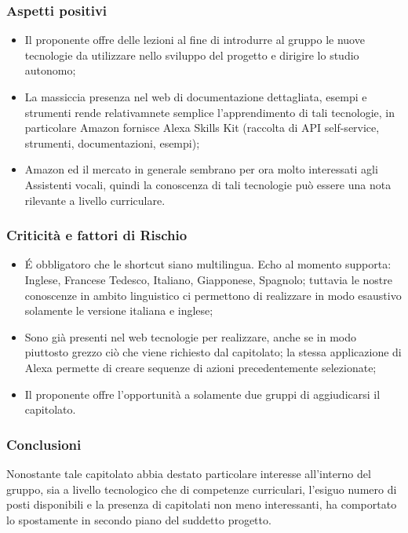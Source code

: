 \subsubsection{Aspetti positivi}
\begin{itemize}
    \item Il proponente offre delle lezioni al fine di introdurre al gruppo le nuove tecnologie da utilizzare nello sviluppo del progetto e dirigire lo studio autonomo;
    \item La massiccia presenza nel web di documentazione dettagliata, esempi e strumenti rende relativamnete semplice l'apprendimento di tali tecnologie, in particolare Amazon fornisce Alexa Skills Kit (raccolta di API self-service, strumenti, documentazioni, esempi);
    \item Amazon ed il mercato in generale sembrano per ora molto interessati agli Assistenti vocali, quindi la conoscenza di tali tecnologie può essere una nota rilevante a livello curriculare.
\end{itemize}
\subsubsection{Criticità e fattori di Rischio}
\begin{itemize}
    \item É obbligatoro che le shortcut siano multilingua. Echo al momento supporta: Inglese, Francese Tedesco, Italiano, Giapponese, Spagnolo; tuttavia le nostre conoscenze in ambito linguistico ci permettono di realizzare in modo esaustivo solamente le versione italiana e inglese;
    \item Sono già presenti nel web tecnologie per realizzare, anche se in modo piuttosto grezzo ciò che viene richiesto dal capitolato; la stessa applicazione di Alexa permette di creare sequenze di azioni precedentemente selezionate;
    \item Il proponente offre l'opportunità a solamente due gruppi di aggiudicarsi il capitolato.
\end{itemize}
\subsubsection{Conclusioni}
Nonostante tale capitolato abbia destato particolare interesse all'interno del gruppo, sia a livello tecnologico che di competenze curriculari, l'esiguo numero di posti disponibili e la presenza di capitolati non meno interessanti, ha comportato lo spostamente in secondo piano del suddetto progetto.